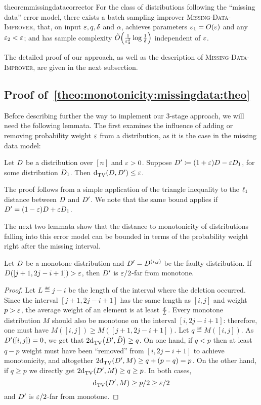 \begin{restatable}{theorem}{missingdatacorrector}\label{theo:monotonicity:missingdata:theo}
For the class of distributions following the ``missing data'' error model, there exists a batch sampling improver \textsc{Missing-Data-Improver}, that, on input $\eps,q,\delta$ and $\alpha$, achieves parameters $\eps_1=\bigO{\eps}$ and any $\eps_2 < \eps$; and has sample complexity $\tildeO{\frac{1}{\eps_2^{3}}\log\frac{1}{\delta}}$ independent of $\eps$. 
\end{restatable}
\noindent The detailed proof of our approach, as well as the description of \textsc{Missing-Data-Improver}, are given in the next subsection.
  
\subsection{Proof of~\autoref{theo:monotonicity:missingdata:theo}}
Before describing further the way to implement our 3-stage approach, we will need the following lemmata. The first examines the influence of adding or removing probability weight $\eps$ from a distribution, as it is the case in the missing data model:
\begin{lemma}\label{lemma:error:add}
Let $\D$ be a distribution over $[n]$ and $\eps>0$. Suppose $\D^\prime\eqdef(1+\eps) \D - \eps \D_1$, for some distribution $\D_1$. Then $\totalvardist{\D}{\D^\prime} \leq \eps$. 
\end{lemma}
\noindent The proof follows from a simple application of the triangle inequality to the $\lp[1]$ distance between $\D$ and $\D^\prime$. We note that the same bound applies if $\D^\prime=(1-\eps)\D+\eps \D_1$.\medskip

The next two lemmata show that the distance to monotonicity of distributions falling into this error model can be bounded in terms of the probability weight right after the missing interval.
\begin{lemma}\label{lemma:consec:intervals:far}
Let $\D$ be a monotone distribution and $\D^\prime=\D^{(i,j)}$ be the faulty distribution. If $\D([j+1,2j-i+1])>\eps$, then $\D^\prime$ is $\eps/2$-far from monotone.
\end{lemma}
\begin{proof}
    Let $L\eqdef j-i$ be the length of the interval where the deletion occurred. 
    Since the interval $[j+1,2j-i+1]$ has the same length as $[i,j]$ and weight $p > \eps$, the average weight of an element is at least $\frac{\eps}{L}$. 
    Every monotone distribution $M$ should also be monotone on the interval $[i,2j-i+1]$: therefore, one must have $M([i,j])\geq M([j+1,2j-i+1])$. Let $q\eqdef M([i,j])$. As $\D^\prime([i,j])=0$, we get that $2\totalvardist{\D^\prime}{\tilde{\D}}\geq q$. On one hand, if $q < p$ then at least $q-p$ weight must have been ``removed'' from $[i,2j-i+1]$ to achieve monotonicity, and altogether $2\totalvardist{\D^\prime}{M}\geq q+(p-q)=p$. On the other hand, if $q \geq p$ we directly get $2\totalvardist{\D^\prime}{M}\geq q\geq p$. In both cases, \[
    \totalvardist{\D^\prime}{M}\geq p/2\geq \eps/2
    \]
    and $\D^\prime$ is $\eps/2$-far from monotone.
\end{proof}

